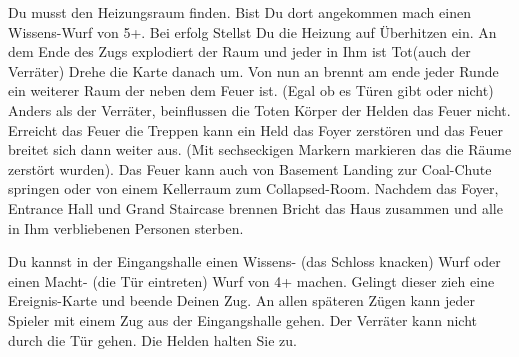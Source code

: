 





Du musst den Heizungsraum finden. Bist Du dort angekommen mach einen Wissens-Wurf von 5+.
Bei erfolg Stellst Du die Heizung auf Überhitzen ein.
An dem Ende des Zugs explodiert der Raum und jeder in Ihm ist Tot(auch der Verräter)
Drehe die Karte danach um.
Von nun an brennt am ende jeder Runde ein weiterer Raum der neben dem Feuer ist.
(Egal ob es Türen gibt oder nicht)
Anders als der Verräter, beinflussen die Toten Körper der Helden das Feuer nicht.
Erreicht das Feuer die Treppen kann ein Held das Foyer zerstören und das Feuer breitet sich dann weiter aus.
(Mit sechseckigen Markern markieren das die Räume zerstört wurden).
Das Feuer kann auch von Basement Landing zur Coal-Chute springen oder von einem Kellerraum zum Collapsed-Room.
Nachdem das Foyer, Entrance Hall und Grand Staircase brennen Bricht das Haus zusammen und alle in Ihm verbliebenen Personen sterben.

\newpage


Du kannst in der Eingangshalle einen Wissens- (das Schloss knacken) Wurf oder einen Macht- (die Tür eintreten) Wurf von 4+ machen. Gelingt dieser zieh eine Ereignis-Karte und beende Deinen Zug. An allen späteren Zügen kann jeder Spieler mit einem Zug aus der Eingangshalle gehen.
Der Verräter kann nicht durch die Tür gehen. Die Helden halten Sie zu.



